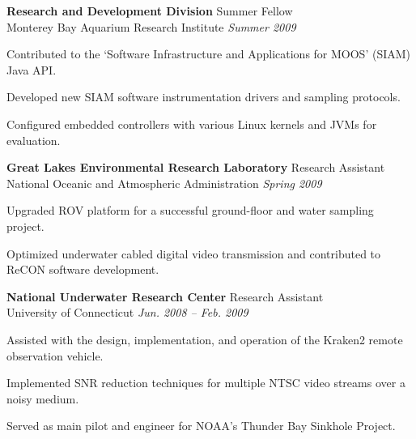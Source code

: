 \documentclass[article]{resume}
\begin{document}
    \textbf{Research and Development Division} \hfill Summer Fellow \\ 
    Monterey Bay Aquarium Research Institute \hfill \textsl{Summer 2009}  \\
    \vspace{ -2 mm}	
    \begin{list2}
	\item Contributed to the `Software Infrastructure and Applications for MOOS' (SIAM) Java API. 
	\item Developed new SIAM software instrumentation drivers and sampling protocols.
	\item Configured embedded controllers with various Linux kernels and JVMs for evaluation.
    \end{list2}\vspace{-2mm}
    
    \textbf{Great Lakes Environmental Research Laboratory } \hfill  Research Assistant \\ 
	National Oceanic and Atmospheric Administration \hfill \textsl{Spring 2009} \\
    \vspace{ -2 mm}	
    \begin{list2}
	\item Upgraded ROV platform for a successful ground-floor and water sampling project.
	\item Optimized underwater cabled digital video transmission and contributed to ReCON software development.
    \end{list2}\vspace{-2mm}

    \textbf{National Underwater Research Center} \hfill Research Assistant \\ 
	University of Connecticut \hfill \textsl{Jun. 2008 -- Feb. 2009} \\
    \vspace{ -2 mm}	
    \begin{list2}
	\item Assisted with the design, implementation, and operation of the Kraken2 remote observation vehicle.
	\item Implemented SNR reduction techniques for multiple NTSC video streams over a noisy medium.
	\item Served as main pilot and engineer for NOAA's Thunder Bay Sinkhole Project. 
    \end{list2}\vspace{-2mm}

   \pagebreak
\end{document}
